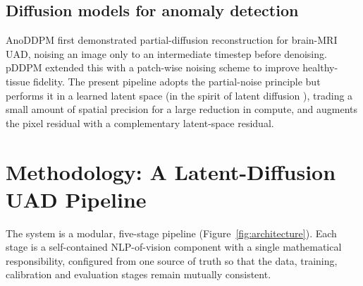 \documentclass[12pt, a4paper]{article}
\begin{document}
\subsection{Diffusion models for anomaly detection}
AnoDDPM \cite{wyatt2022} first demonstrated partial-diffusion reconstruction for brain-MRI UAD, noising an image only to an intermediate timestep before denoising. pDDPM \cite{behrendt2023} extended this with a patch-wise noising scheme to improve healthy-tissue fidelity. The present pipeline adopts the partial-noise principle but performs it in a learned latent space (in the spirit of latent diffusion \cite{rombach2022}), trading a small amount of spatial precision for a large reduction in compute, and augments the pixel residual with a complementary latent-space residual.

\section{Methodology: A Latent-Diffusion UAD Pipeline}
The system is a modular, five-stage pipeline (Figure~\ref{fig:architecture}). Each stage is a self-contained NLP-of-vision component with a single mathematical responsibility, configured from one source of truth so that the data, training, calibration and evaluation stages remain mutually consistent.
\end{document}
